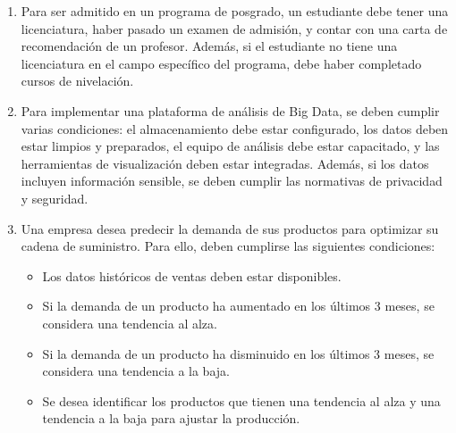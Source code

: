 \documentclass[12pt]{article}
\begin{document}
\begin{itemize}
\begin{enumerate}
                \item Para ser admitido en un programa de posgrado, un estudiante debe tener una licenciatura, haber pasado un examen de admisión, y contar con una carta de recomendación de un profesor. Además, si el estudiante no tiene una licenciatura en el campo específico del programa, debe haber completado cursos de nivelación.
                
                \item Para implementar una plataforma de análisis de Big Data, se deben cumplir varias condiciones: el almacenamiento debe estar configurado, los datos deben estar limpios y preparados, el equipo de análisis debe estar capacitado, y las herramientas de visualización deben estar integradas. Además, si los datos incluyen información sensible, se deben cumplir las normativas de privacidad y seguridad.
                
                \item Una empresa desea predecir la demanda de sus productos para optimizar su cadena de suministro. Para ello, deben cumplirse las siguientes condiciones:
                    \begin{itemize}
                        \item Los datos históricos de ventas deben estar disponibles.
                        \item Si la demanda de un producto ha aumentado en los últimos 3 meses, se considera una tendencia al alza.
                        \item Si la demanda de un producto ha disminuido en los últimos 3 meses, se considera una tendencia a la baja.
                        \item Se desea identificar los productos que tienen una tendencia al alza y una tendencia a la baja para ajustar la producción.
                    \end{itemize}
            \end{enumerate}
        \end{itemize}
\end{document}
